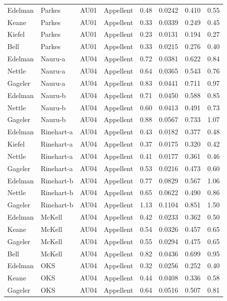 \documentclass{monashthesis}
\begin{document}
\begin{center}
\begin{longtable}{llllllll}
Edelman & Parkes & AU01 & Appellent & 0.48 & 0.0242 & 0.410 & 0.55 \\
Keane & Parkes & AU01 & Appellent & 0.33 & 0.0339 & 0.249 & 0.45 \\
Kiefel & Parkes & AU01 & Appellent & 0.23 & 0.0131 & 0.194 & 0.27 \\
Bell & Parkes & AU01 & Appellent & 0.33 & 0.0215 & 0.276 & 0.40 \\
Edelman & Nauru-a & AU04 & Appellent & 0.72 & 0.0381 & 0.622 & 0.84 \\
Nettle & Nauru-a & AU04 & Appellent & 0.64 & 0.0365 & 0.543 & 0.76 \\
Gageler & Nauru-a & AU04 & Appellent & 0.83 & 0.0441 & 0.711 & 0.97 \\
Edelman & Nauru-b & AU04 & Appellent & 0.71 & 0.0450 & 0.588 & 0.85 \\
Nettle & Nauru-b & AU04 & Appellent & 0.60 & 0.0413 & 0.491 & 0.73 \\
Gageler & Nauru-b & AU04 & Appellent & 0.88 & 0.0567 & 0.733 & 1.07 \\
Edelman & Rinehart-a & AU04 & Appellent & 0.43 & 0.0182 & 0.377 & 0.48 \\
Kiefel & Rinehart-a & AU04 & Appellent & 0.37 & 0.0175 & 0.320 & 0.42 \\
Nettle & Rinehart-a & AU04 & Appellent & 0.41 & 0.0177 & 0.361 & 0.46 \\
Gageler & Rinehart-a & AU04 & Appellent & 0.53 & 0.0216 & 0.473 & 0.60 \\
Edelman & Rinehart-b & AU04 & Appellent & 0.77 & 0.0829 & 0.567 & 1.06 \\
Nettle & Rinehart-b & AU04 & Appellent & 0.65 & 0.0622 & 0.490 & 0.86 \\
Gageler & Rinehart-b & AU04 & Appellent & 1.13 & 0.1104 & 0.851 & 1.50 \\
Edelman & McKell & AU04 & Appellent & 0.42 & 0.0233 & 0.362 & 0.50 \\
Keane & McKell & AU04 & Appellent & 0.54 & 0.0326 & 0.457 & 0.65 \\
Gageler & McKell & AU04 & Appellent & 0.55 & 0.0294 & 0.475 & 0.65 \\
Bell & McKell & AU04 & Appellent & 0.82 & 0.0436 & 0.699 & 0.95 \\
Edelman & OKS & AU04 & Appellent & 0.32 & 0.0256 & 0.252 & 0.40 \\
Keane & OKS & AU04 & Appellent & 0.44 & 0.0408 & 0.336 & 0.58 \\
Gageler & OKS & AU04 & Appellent & 0.64 & 0.0516 & 0.507 & 0.81 \\

\end{longtable}
\end{center}
\end{document}
